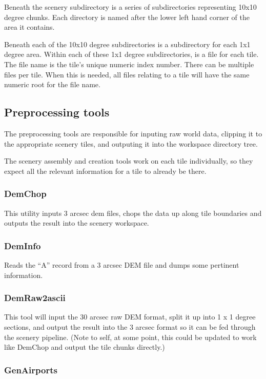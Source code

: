 \documentclass[12pt]{article}
\begin{document}
Beneath the scenery subdirectory is a series of subdirectories
representing 10x10 degree chunks.  Each directory is named after the
lower left hand corner of the area it contains.

Beneath each of the 10x10 degree subdirectories is a subdirectory for
each 1x1 degree area.  Within each of these 1x1 degree subdirectories,
is a file for each tile.  The file name is the tile's unique numeric
index number.  There can be multiple files per tile.  When this is
needed, all files relating to a tile will have the same numeric root
for the file name.

\subsection{Preprocessing tools}

The preprocessing tools are responsible for inputing raw world data,
clipping it to the appropriate scenery tiles, and outputing it into
the workspace directory tree.

The scenery assembly and creation tools work on each tile
individually, so they expect all the relevant information for a tile
to already be there.

\subsubsection{DemChop}

This utility inputs 3 arcsec dem files, chops the data up along tile
boundaries and outputs the result into the scenery workspace.

\subsubsection{DemInfo}

Reads the ``A'' record from a 3 arcsec DEM file and dumps some
pertinent information.

\subsubsection{DemRaw2ascii}

This tool will input the 30 arcsec raw DEM format, split it up into 1
x 1 degree sections, and output the result into the 3 arcsec format so
it can be fed through the scenery pipeline.  (Note to self, at some
point, this could be updated to work like DemChop and output the tile
chunks directly.)

\subsubsection{GenAirports}
\end{document}

